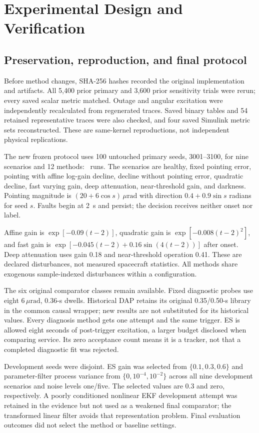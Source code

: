 \documentclass[10pt,journal]{IEEEtran}
\newcommand{\um}{\,\mu\mathrm{rad}}
\begin{document}
\section{Experimental Design and Verification}
\subsection{Preservation, reproduction, and final protocol}
Before method changes, SHA-256 hashes recorded the original implementation and artifacts. All 5,400 prior primary and 3,600 prior sensitivity trials were rerun; every saved scalar metric matched. Outage and angular excitation were independently recalculated from regenerated traces. Saved binary tables and 54 retained representative traces were also checked, and four saved Simulink metric sets reconstructed. These are same-kernel reproductions, not independent physical replications.

The new frozen protocol uses 100 untouched primary seeds, 3001--3100, for nine scenarios and 12 methods: \NPrimary\ runs. The scenarios are healthy, fixed pointing error, pointing with affine log-gain decline, decline without pointing error, quadratic decline, fast varying gain, deep attenuation, near-threshold gain, and darkness. Pointing magnitude is $(20+6\cos s)\um$ with direction $0.4+0.9\sin s$ radians for seed $s$. Faults begin at 2~s and persist; the decision receives neither onset nor label.

Affine gain is $\exp[-0.09(t-2)]$, quadratic gain is $\exp[-0.008(t-2)^2]$, and fast gain is $\exp[-0.045(t-2)+0.16\sin(4(t-2))]$ after onset. Deep attenuation uses gain 0.18 and near-threshold operation 0.41. These are declared disturbances, not measured spacecraft statistics. All methods share exogenous sample-indexed disturbances within a configuration.

The six original comparator classes remain available. Fixed diagnostic probes use eight $6\um$, 0.36-s dwells. Historical DAP retains its original 0.35/0.50-s library in the common causal wrapper; new results are not substituted for its historical values. Every diagnosis method gets one attempt and the same trigger. ES is allowed eight seconds of post-trigger excitation, a larger budget disclosed when comparing service. Its zero acceptance count means it is a tracker, not that a completed diagnostic fit was rejected.

Development seeds were disjoint. ES gain was selected from $\{0.1,0.3,0.6\}$ and parameter-filter process variance from $\{0,10^{-4},10^{-2}\}$ across all nine development scenarios and noise levels one/five. The selected values are 0.3 and zero, respectively. A poorly conditioned nonlinear EKF development attempt was retained in the evidence but not used as a weakened final comparator; the transformed linear filter avoids that representation problem. Final evaluation outcomes did not select the method or baseline settings.
\end{document}
